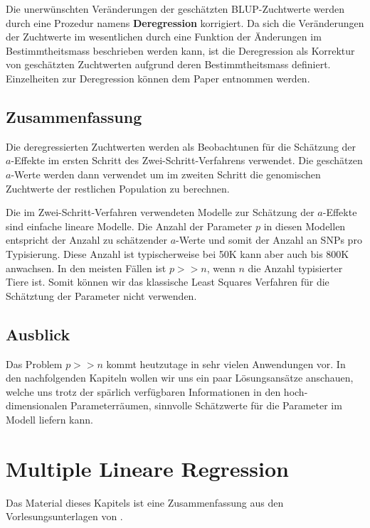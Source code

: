 \documentclass[]{book}
\begin{document}
Die unerwünschten Veränderungen der geschätzten BLUP-Zuchtwerte werden
durch eine Prozedur namens \textbf{Deregression} korrigiert. Da sich die
Veränderungen der Zuchtwerte im wesentlichen durch eine Funktion der
Änderungen im Bestimmtheitsmass beschrieben werden kann, ist die
Deregression als Korrektur von geschätzten Zuchtwerten aufgrund deren
Bestimmtheitsmass definiert. Einzelheiten zur Deregression können dem
Paper \citep{GTF2009} entnommen werden.

\section{Zusammenfassung}\label{zusammenfassung}

Die deregressierten Zuchtwerten werden als Beobachtunen für die
Schätzung der \(a\)-Effekte im ersten Schritt des
Zwei-Schritt-Verfahrens verwendet. Die geschätzen \(a\)-Werte werden
dann verwendet um im zweiten Schritt die genomischen Zuchtwerte der
restlichen Population zu berechnen.

Die im Zwei-Schritt-Verfahren verwendeten Modelle zur Schätzung der
\(a\)-Effekte sind einfache lineare Modelle. Die Anzahl der Parameter
\(p\) in diesen Modellen entspricht der Anzahl zu schätzender
\(a\)-Werte und somit der Anzahl an SNPs pro Typisierung. Diese Anzahl
ist typischerweise bei 50K kann aber auch bis 800K anwachsen. In den
meisten Fällen ist \(p >> n\), wenn \(n\) die Anzahl typisierter Tiere
ist. Somit können wir das klassische Least Squares Verfahren für die
Schätztung der Parameter nicht verwenden.

\section{Ausblick}\label{ausblick}

Das Problem \(p >> n\) kommt heutzutage in sehr vielen Anwendungen vor.
In den nachfolgenden Kapiteln wollen wir uns ein paar Lösungsansätze
anschauen, welche uns trotz der spärlich verfügbaren Informationen in
den hoch-dimensionalen Parameterräumen, sinnvolle Schätzwerte für die
Parameter im Modell liefern kann.

\chapter{Multiple Lineare Regression}\label{linreg}

Das Material dieses Kapitels ist eine Zusammenfassung aus den
Vorlesungsunterlagen von \citep{BM2014}.
\end{document}
